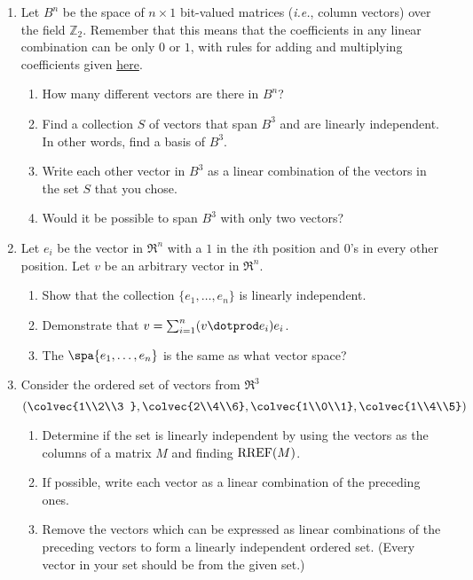 


\begin{enumerate}
\item \label{bitsprob}Let $B^n$ be the space of $n\times 1$ bit-valued matrices ({\itshape i.e.}, column vectors) over the field \({\mathbb Z}_2\).
Remember that this means that the coefficients in any linear combination can be only \(0\) or \(1\), with rules for adding and multiplying coefficients given \hyperref[Z2]{here}.  
\begin{enumerate}
\item How many different vectors are there in $B^n$?
\item  Find a collection $S$ of vectors that span $B^3$ and are linearly independent.  In other words, find a basis of $B^3$.
\item Write each other vector in $B^3$ as a linear combination of the vectors in the set $S$ that you chose.
\item Would it be possible to span $B^3$ with only two vectors?
\end{enumerate}



\item \label{stdbasis} Let $e_i$ be the vector in $\Re^n$ with a $1$ in the $i$th position and $0$'s in every other position.  Let $v$ be an arbitrary vector in $\Re^n$.
\begin{enumerate}
\item Show that the collection $\{e_1, \ldots, e_n \}$ is linearly independent.
\item Demonstrate that $v=\sum_{i=1}^n (v\dotprod e_i)e_i$.
\item The $\spa \{e_1, \ldots, e_n \}$ is the same as what vector space?
\end{enumerate}


\item Consider the ordered set of vectors from $\Re^3$
\[
\left( \colvec{1\\2\\3 } , \colvec{2\\4\\6}, \colvec{1\\0\\1} , \colvec{1\\4\\5} \right) 
\]
\begin{enumerate}
\item Determine if the set is linearly independent by using the vectors as the columns of a matrix $M$ and finding ${\rm RREF}(M)$.
\item If possible, write each vector as a linear combination of the preceding ones.
\item Remove the vectors which can be expressed as linear combinations of the preceding vectors to form a linearly independent ordered set. (Every vector in your set should be from the given set.)
\end{enumerate}


\end{enumerate}
